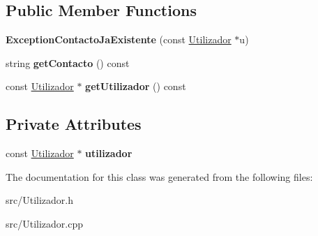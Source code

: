 \subsection*{Public Member Functions}
\begin{DoxyCompactItemize}
\item 
\hypertarget{class_exception_contacto_ja_existente_a20e437ebeb9b6513fbda6c4c812f3712}{}{\bfseries Exception\+Contacto\+Ja\+Existente} (const \hyperlink{class_utilizador}{Utilizador} $\ast$u)\label{class_exception_contacto_ja_existente_a20e437ebeb9b6513fbda6c4c812f3712}

\item 
\hypertarget{class_exception_contacto_ja_existente_a3dd047ad6d893ee659185decae65bbfa}{}string {\bfseries get\+Contacto} () const \label{class_exception_contacto_ja_existente_a3dd047ad6d893ee659185decae65bbfa}

\item 
\hypertarget{class_exception_contacto_ja_existente_a7f765436d70f97cc1b5275f02905eb84}{}const \hyperlink{class_utilizador}{Utilizador} $\ast$ {\bfseries get\+Utilizador} () const \label{class_exception_contacto_ja_existente_a7f765436d70f97cc1b5275f02905eb84}

\end{DoxyCompactItemize}
\subsection*{Private Attributes}
\begin{DoxyCompactItemize}
\item 
\hypertarget{class_exception_contacto_ja_existente_aed308498b5a6ef92b549c77fa1a4e362}{}const \hyperlink{class_utilizador}{Utilizador} $\ast$ {\bfseries utilizador}\label{class_exception_contacto_ja_existente_aed308498b5a6ef92b549c77fa1a4e362}

\end{DoxyCompactItemize}


The documentation for this class was generated from the following files\+:\begin{DoxyCompactItemize}
\item 
src/Utilizador.\+h\item 
src/Utilizador.\+cpp\end{DoxyCompactItemize}
